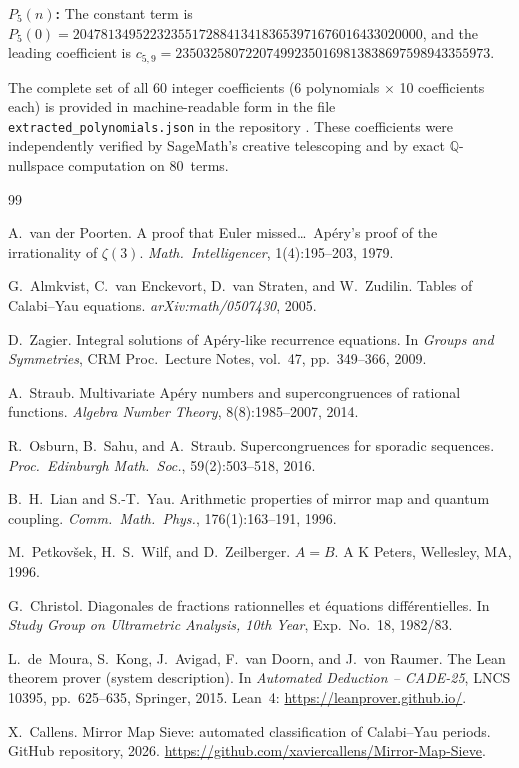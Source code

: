 \documentclass[11pt, a4paper]{article}
\begin{document}
\noindent\textbf{$P_5(n)$:} The constant term is $P_5(0) = 20478134952232355172884134183653971676016433020000$, and the leading coefficient is $c_{5,9} = 235032580722074992350169813838697598943355973$.

\medskip
The complete set of all 60 integer coefficients (6 polynomials $\times$ 10 coefficients each) is provided in machine-readable form in the file \texttt{extracted\_polynomials.json} in the repository \cite{repo}. These coefficients were independently verified by SageMath's creative telescoping and by exact $\mathbb{Q}$-nullspace computation on 80~terms.


\begin{thebibliography}{99}

A.~van der Poorten.
\newblock A proof that Euler missed\ldots\ Ap\'ery's proof of the irrationality of $\zeta(3)$.
\newblock \textit{Math.\ Intelligencer}, 1(4):195--203, 1979.

G.~Almkvist, C.~van Enckevort, D.~van Straten, and W.~Zudilin.
\newblock Tables of Calabi--Yau equations.
\newblock \textit{arXiv:math/0507430}, 2005.

D.~Zagier.
\newblock Integral solutions of {Ap\'ery}-like recurrence equations.
\newblock In \textit{Groups and Symmetries}, CRM Proc.\ Lecture Notes, vol.~47, pp.~349--366, 2009.

A.~Straub.
\newblock Multivariate {Ap\'ery} numbers and supercongruences of rational functions.
\newblock \textit{Algebra Number Theory}, 8(8):1985--2007, 2014.

R.~Osburn, B.~Sahu, and A.~Straub.
\newblock Supercongruences for sporadic sequences.
\newblock \textit{Proc.\ Edinburgh Math.\ Soc.}, 59(2):503--518, 2016.

B.~H.~Lian and S.-T.~Yau.
\newblock Arithmetic properties of mirror map and quantum coupling.
\newblock \textit{Comm.\ Math.\ Phys.}, 176(1):163--191, 1996.

M.~Petkov\v{s}ek, H.~S.~Wilf, and D.~Zeilberger.
\newblock \textit{$A=B$}.
\newblock A K Peters, Wellesley, MA, 1996.

G.~Christol.
\newblock Diagonales de fractions rationnelles et \'equations diff\'erentielles.
\newblock In \textit{Study Group on Ultrametric Analysis, 10th Year}, Exp.\ No.~18, 1982/83.

L.~de~Moura, S.~Kong, J.~Avigad, F.~van Doorn, and J.~von Raumer.
\newblock The {Lean} theorem prover (system description).
\newblock In \textit{Automated Deduction -- CADE-25}, LNCS 10395, pp.~625--635, Springer, 2015.
\newblock Lean~4: \url{https://leanprover.github.io/}.

X.~Callens.
\newblock Mirror Map Sieve: automated classification of Calabi--Yau periods.
\newblock GitHub repository, 2026.
\newblock \url{https://github.com/xaviercallens/Mirror-Map-Sieve}.

\end{thebibliography}
\end{document}
